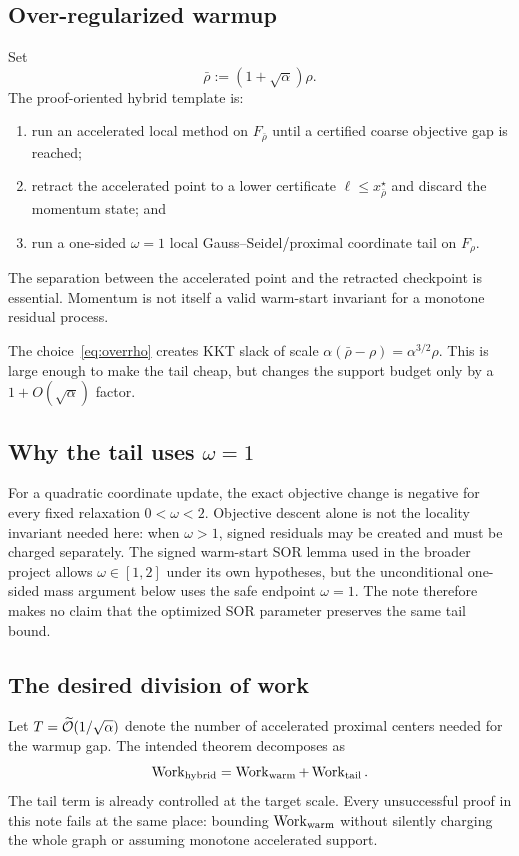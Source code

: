 \subsection{Over-regularized warmup}

Set
\begin{equation}
  \bar\rho:=(1+\sqrt\alpha)\rho.
  \label{eq:overrho}
\end{equation}
The proof-oriented hybrid template is:
\begin{enumerate}[label=\arabic*.,leftmargin=*]
  \item run an accelerated local method on $F_{\bar\rho}$ until a certified
  coarse objective gap is reached;
  \item retract the accelerated point to a lower certificate
  $\ell\le x_{\bar\rho}^\star$ and discard the momentum state; and
  \item run a one-sided $\omega=1$ local Gauss--Seidel/proximal coordinate
  tail on $F_\rho$.
\end{enumerate}
The separation between the accelerated point and the retracted checkpoint is
essential.  Momentum is not itself a valid warm-start invariant for a
monotone residual process.

The choice~\eqref{eq:overrho} creates KKT slack of scale
$\alpha(\bar\rho-\rho)=\alpha^{3/2}\rho$.  This is large enough to make the
tail cheap, but changes the support budget only by a $1+O(\sqrt\alpha)$
factor.

\subsection{Why the tail uses \texorpdfstring{$\omega=1$}{omega=1}}

For a quadratic coordinate update, the exact objective change is negative for
every fixed relaxation $0<\omega<2$.  Objective descent alone is not the
locality invariant needed here: when $\omega>1$, signed residuals may be
created and must be charged separately.  The signed warm-start SOR lemma used
in the broader project allows $\omega\in[1,2]$ under its own hypotheses, but
the unconditional one-sided mass argument below uses the safe endpoint
$\omega=1$.  The note therefore makes no claim that the optimized SOR
parameter preserves the same tail bound.

\subsection{The desired division of work}

Let $T=\widetilde{\mathcal{O}}(1/\sqrt\alpha)$ denote the number of accelerated proximal
centers needed for the warmup gap.  The intended theorem decomposes as
\[
  \operatorname{Work}_{\mathrm{hybrid}}
  =\operatorname{Work}_{\mathrm{warm}}+\operatorname{Work}_{\mathrm{tail}}.
\]
The tail term is already controlled at the target scale.  Every unsuccessful
proof in this note fails at the same place: bounding $\operatorname{Work}_{\mathrm{warm}}$
without silently charging the whole graph or assuming monotone accelerated
support.
